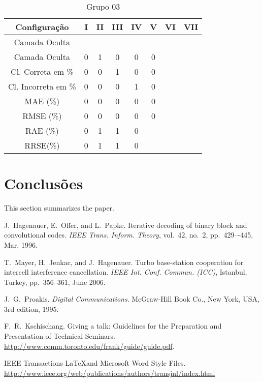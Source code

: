 \documentclass[journal, a4paper]{IEEEtran}
\begin{document}
\begin{table}[H]
	\begin{center}
		\caption{Grupo $03$}
		\label{grupo03}
		\begin{tabular}{|c|c|c|c|c|c|c|c|}\hline	
			\textbf{Configuração} &\textbf{I}&\textbf{II}&\textbf{III}&\textbf{IV}&\textbf{V}&\textbf{VI}&\textbf{VII} \\ \hline 
			{Camada Oculta} &  &  &  &  & & &  \\ \hline
			{Camada Oculta} &0 & 1 & 0 & 0 & 0 & &\\ \hline
			{Cl. Correta em \%} & 0 & 0 & 1 & 0 & 0 & & \\ \hline
			{Cl. Incorreta em \%} & 0 & 0 & 0 & 1 & 0 & &\\ \hline
			{MAE (\%)} & 0 & 0 & 0 & 0 & 0 & &  \\ \hline
			{RMSE (\%)} & 0 & 0 & 0 & 0 & 0 & & \\ \hline
			{RAE (\%)} & 0 & 1 & 1 & 0 & & & \\ \hline
			{RRSE(\%)} & 0 & 1 & 1 & 0 & & & \\ \hline
		\end{tabular}  
	\end{center}
\end{table}






\section{Conclusões}
	This section summarizes the paper.

\begin{thebibliography}{5}

	J.~Hagenauer, E.~Offer, and L.~Papke. Iterative decoding of binary block
	and convolutional codes. {\em IEEE Trans. Inform. Theory},
	vol.~42, no.~2, pp.~429–-445, Mar. 1996.

	T.~Mayer, H.~Jenkac, and J.~Hagenauer. Turbo base-station cooperation for intercell interference cancellation. {\em IEEE Int. Conf. Commun. (ICC)}, Istanbul, Turkey, pp.~356--361, June 2006.

	J.~G.~Proakis. {\em Digital Communications}. McGraw-Hill Book Co.,
	New York, USA, 3rd edition, 1995.

	F.~R.~Kschischang. Giving a talk: Guidelines for the Preparation and Presentation of Technical Seminars.
	\url{http://www.comm.toronto.edu/frank/guide/guide.pdf}.

	IEEE Transactions \LaTeX and Microsoft Word Style Files.
	\url{http://www.ieee.org/web/publications/authors/transjnl/index.html}

\end{thebibliography}

\end{document}
